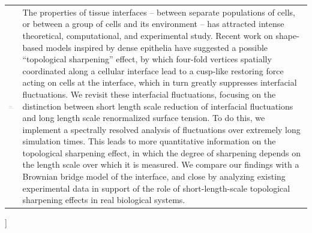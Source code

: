 \documentclass[twoside,twocolumn,9pt]{article}
\begin{document}
\begin{@twocolumnfalse}
\begin{tabular}{m{4.5cm} p{13.5cm} }
\includegraphics{head_foot/dates} & \noindent
\normalsize{The properties of tissue interfaces -- between separate populations of cells, or between a group of cells and its environment -- has attracted intense theoretical, computational, and experimental study. Recent work on shape-based models inspired by dense epithelia have suggested a possible ``topological sharpening'' effect, by which four-fold vertices spatially coordinated along a cellular interface lead to a cusp-like restoring force acting on cells at the interface, which in turn greatly suppresses interfacial fluctuations. We revisit these interfacial fluctuations, focusing on the distinction between  short length scale reduction of interfacial fluctuations and long length scale renormalized surface tension. To do this, we implement a spectrally resolved analysis of fluctuations over extremely long simulation times. This leads to more quantitative information on the topological sharpening effect, in which the degree of sharpening depends on the length scale over which it is measured. We compare our findings with a Brownian bridge model of the interface, and close by analyzing existing experimental data in support of the role of short-length-scale topological sharpening effects in real biological systems. 
} \\

\end{tabular}

 \end{@twocolumnfalse} \vspace{0.6cm}

  ]

\renewcommand*\rmdefault{bch}\normalfont\upshape
\rmfamily
\section*{}
\vspace{-1cm}


\end{document}
